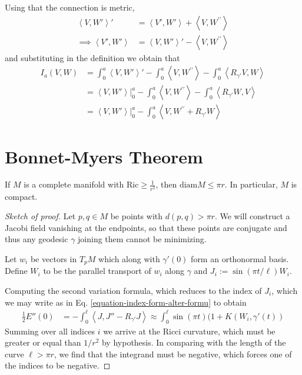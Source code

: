 \documentclass{book}
\begin{document}
\begin{remark}
\label{remark-index-form-alternative-formula}
Using that the connection is metric,
$$
\begin{aligned}
\left\langle{}V,W'\right\rangle{}'&=\left\langle{}V',W'\right\rangle{}+
\left\langle{}V,W^{\prime\prime}\right\rangle{}\\
\implies
\left\langle{}V',W'\right\rangle{}&=\left\langle{}V,W'\right\rangle{}'-
\left\langle{}V,W^{\prime\prime}\right\rangle{}
\end{aligned}
$$
and substituting in the definition we obtain
that
\begin{equation}
\label{equation-index-form-alter-formu}
\begin{aligned}
I_a(V,W)&=\int_0^a\left\langle{}V,W'\right\rangle{}'-\int_0^a
\left\langle{}V,W^{\prime\prime}\right\rangle{}-\int_0^a
\left\langle{}R_{\gamma'}V,W\right\rangle{}\\
&=\left\langle{}V,W'\right\rangle{}|_{0}^a-\int_0^a
\left\langle{}V,W^{\prime\prime}\right\rangle{}-\int_0^a\left\langle{}R_{\gamma'}
W,V\right\rangle{}\\
&=\left\langle{}V,W'\right\rangle{}|_{0}^a-\int_0^a
\left\langle{}V,W^{\prime\prime}+R_{\gamma'}W\right\rangle{}
\end{aligned}
\end{equation}
\end{remark}

\section{Bonnet-Myers Theorem}
\label{section-Bonnet-Myers-theorem}

\begin{theorem}
\label{theorem-Bonnet-Myers}
If $M$ is a complete manifold with
$\text{Ric} \geq \frac{1}{r^2}$, then
$\text{diam}M\leq \pi r$. In particular, $M$
is compact.
\end{theorem}

\begin{proof}[Sketch of proof]
Let $p,q \in M$ be points with $d(p,q)>\pi
r$. We will construct a Jacobi
field vanishing at the endpoints, so that
these points are conjugate and thus
any geodesic $\gamma$ joining them cannot be
minimizing.

Let $w_i$ be vectors in $T_pM$ which along
with $\gamma'(0)$ form an orthonormal
basis. Define $W_i$ to be the parallel
transport of $w_i$ along $\gamma$ and
$J_i:=\sin(\pi t/\ell)W_i$.

Computing the second variation formula, which
reduces to the index of $J_i$,
which we may write as in Eq.
\ref{equation-index-form-alter-formu} to
obtain
$$
\begin{aligned}
\frac{1}{2}E''(0)&=-\int_0^\ell\left\langle{}J,J''-
R_{\gamma'}J\right\rangle{}
\approx\int_0^\ell \sin(\pi
t)(1+K(W_i,\gamma'(t))
\end{aligned}
$$
Summing over all indices $i$ we arrive at the
Ricci curvature, which must be
greater or equal than $1/r^2$ by hypothesis.
In comparing with the length of the
curve $\ell>\pi r$, we find that the
integrand must be
negative, which forces one of the indices to
be negative.
\end{proof}
\end{document}
